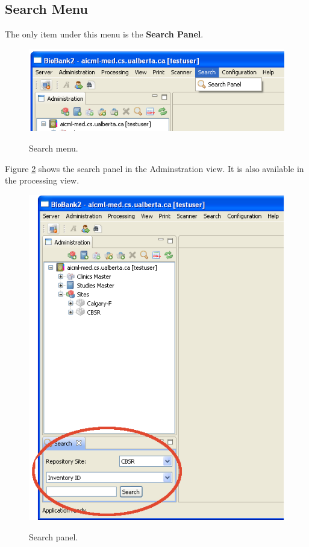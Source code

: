 \subsection{Search Menu}
The only item under this menu is the \textbf{Search Panel}.
\begin{figure}[H]
  \centering
  \scalebox{0.5}
	   { \includegraphics*{screenshots/overview/main_menu_search} }
	   \caption{Search menu.}
	   \label{fig:main_menu_search}
\end{figure}
Figure \ref{fig:search_panel} shows the search panel in the Adminstration
view. It is also available in the processing view.
\begin{figure}[H]
  \centering
  \scalebox{0.5}
	   { \includegraphics*{screenshots/overview/search_panel} }
	   \caption{Search panel.}
	   \label{fig:search_panel}
\end{figure}

